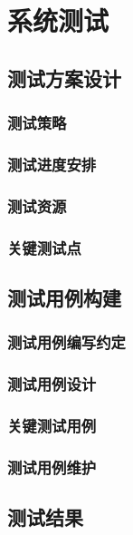 
\chapter{系统测试}\label{chap:6}

\templateblank

\section{测试方案设计}

\templateblank

\subsection{测试策略}

\templateblank

\subsection{测试进度安排}

\templateblank

\subsection{测试资源}

\templateblank

\subsection{关键测试点}

\templateblank

\section{测试用例构建}

\templateblank

\subsection{测试用例编写约定}

\templateblank

\subsection{测试用例设计}

\templateblank

\subsection{关键测试用例}

\templateblank

\subsection{测试用例维护}

\templateblank

\section{测试结果}

\templateblank
